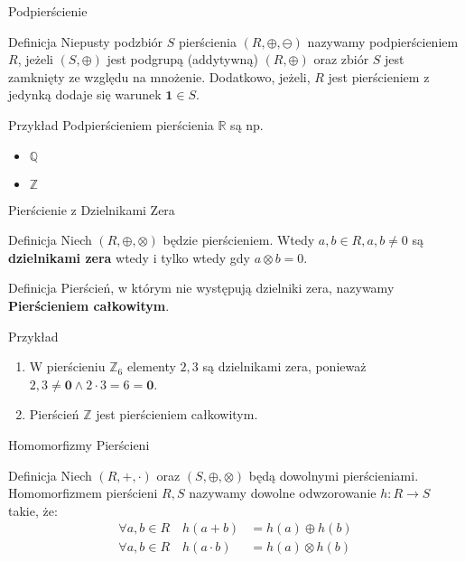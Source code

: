 \documentclass{beamer}
\begin{document}
\begin{frame}{Podpierścienie}
    \begin{block}{Definicja}
        Niepusty podzbiór $S$ pierścienia $(R, \oplus, \ominus)$ nazywamy podpierścieniem $R$, jeżeli $(S,\oplus)$ jest podgrupą (addytywną) $(R,\oplus)$ oraz zbiór $S$ jest zamknięty ze względu na mnożenie.
        Dodatkowo, jeżeli, $R$ jest pierścieniem z jedynką dodaje się warunek $\mathbf{1} \in S$. 
    \end{block}
    \begin{exampleblock}{Przykład}
        Podpierścieniem pierścienia $\mathbb{R}$ są np.
        \begin{itemize}
            \item $\mathbb{Q}$
            \item $\mathbb{Z}$
        \end{itemize}
    \end{exampleblock}
\end{frame}

\begin{frame}{Pierścienie z Dzielnikami Zera}
    \begin{block}{Definicja}
        Niech $(R, \oplus, \otimes)$ będzie pierścieniem. Wtedy $a,b \in R, a,b \neq 0$ są \textbf{dzielnikami zera} wtedy i tylko wtedy gdy $a \otimes b = 0$.
    \end{block}
    \begin{block}{Definicja}
        Pierścień, w którym nie występują dzielniki zera, nazywamy \textbf{Pierścieniem całkowitym}.
    \end{block}
    \begin{exampleblock}{Przykład}
        \begin{enumerate}
            \item W pierścieniu $\mathbb{Z}_6$ elementy $2,3$ są dzielnikami zera, ponieważ $2,3 \neq \mathbf{0} \land 2\cdot 3 = 6 = \mathbf{0}$.
            \item Pierścień $\mathbb{Z}$ jest pierścieniem całkowitym. 
        \end{enumerate}        
    \end{exampleblock}
\end{frame}

\begin{frame}{Homomorfizmy Pierścieni}
    \begin{block}{Definicja}
        Niech $(R, +, \cdot)$ oraz $(S, \oplus, \otimes)$ będą dowolnymi pierścieniami.
        Homomorfizmem pierścieni $R,S$ nazywamy dowolne odwzorowanie $h : R \rightarrow S$ takie, że:
        \begin{align*}
            \forall a,b \in R \quad h(a + b) & = h(a) \oplus h(b) \\
            \forall a,b \in R \quad h(a \cdot b) & = h(a) \otimes h(b) 
        \end{align*}
    \end{block}
\end{frame}
\end{document}
